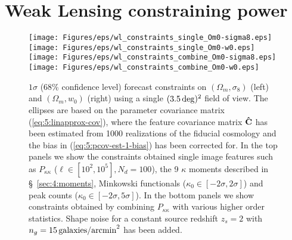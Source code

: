 \section{Weak Lensing constraining power}
\label{sec:5:constraints}

\begin{figure}
\begin{center}
\texttt{[image: Figures/eps/wl\_constraints\_single\_Om0-sigma8.eps]} \texttt{[image: Figures/eps/wl\_constraints\_single\_Om0-w0.eps]}
\texttt{[image: Figures/eps/wl\_constraints\_combine\_Om0-sigma8.eps]} \texttt{[image: Figures/eps/wl\_constraints\_combine\_Om0-w0.eps]}
\end{center}
\caption{$1\sigma$ (68\% confidence level) forecast constraints on $(\Omega_m,\sigma_8)$ (left) and $(\Omega_m,w_0)$ (right) using a single $(3.5\,{\rm deg})^2$ field of view. The ellipses are based on the parameter covariance matrix (\ref{eq:5:linapprox-cov}), where the feature covariance matrix $\mathbf{\hat{C}}$ has been estimated from 1000 realizations of the fiducial cosmology and the bias in (\ref{eq:5:pcov-est-1-bias}) has been corrected for. In the top panels we show the constraints obtained single image features such as $P_{\kappa\kappa}$ ($\ell \in [10^2,10^5],N_d=100$), the 9 $\kappa$ moments described in \S~\ref{sec:4:moments}, Minkowski functionals ($\kappa_0\in[-2\sigma,2\sigma]$) and peak counts ($\kappa_0\in[-2\sigma,5\sigma]$). In the bottom panels we show constraints obtained by combining $P_{\kappa\kappa}$ with various higher order statistics. Shape noise for a constant source redshift $z_s=2$ with $n_g=15\,{\rm galaxies/arcmin}^2$ has been added.}
\label{fig:5:wlconstraints}
\end{figure}

%